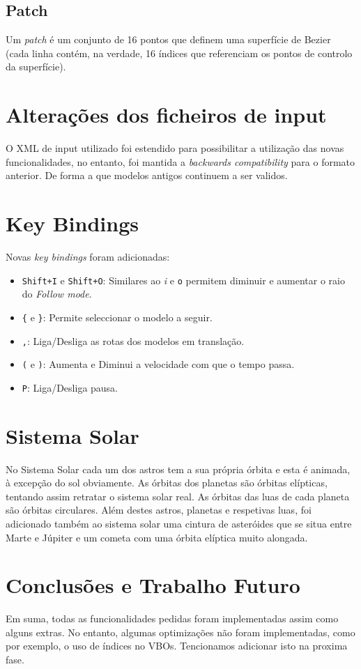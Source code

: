 \documentclass[a4paper]{article}
\begin{document}
\subsection{Patch}

Um \textit{patch} é um conjunto de 16 pontos que definem uma superfície de Bezier (cada linha contém, na verdade, 16 índices que referenciam os pontos de controlo da superfície).


\section{Alterações dos ficheiros de input}\label{sec:estrutura-ficheiros}

O XML de input utilizado foi estendido para possibilitar a utilização das novas funcionalidades, no entanto, foi mantida a \textit{backwards compatibility} para o formato anterior. De forma a que modelos antigos continuem a ser validos.

\section{Key Bindings}

Novas \textit{key bindings} foram adicionadas:

\begin{itemize}
    \item \texttt{Shift+I} e \texttt{Shift+O}: Similares ao \textit{i} e
        \texttt{o} permitem diminuir e aumentar o raio do \textit{Follow mode}.
    \item \verb!{! e \verb!}!: Permite seleccionar o modelo a seguir.
    \item \texttt{,}: Liga/Desliga as rotas dos modelos em translação.
    \item \verb!(! e \verb!)!: Aumenta e Diminui a velocidade com que o tempo
        passa.
    \item \texttt{P}: Liga/Desliga pausa.
\end{itemize}

\section{Sistema Solar}

No Sistema Solar cada um dos astros tem a sua própria órbita e esta é animada, à excepção do sol obviamente.
As órbitas dos planetas são órbitas elípticas, tentando assim retratar o sistema solar real. As órbitas das luas de cada planeta são órbitas circulares.
Além destes astros, planetas e respetivas luas, foi adicionado também ao sistema solar uma cintura de asteróides que se situa entre Marte e Júpiter e um cometa com uma órbita elíptica muito alongada.

\section{Conclusões e Trabalho Futuro}

Em suma, todas as funcionalidades pedidas foram implementadas assim como alguns extras. No entanto, algumas optimizações não foram implementadas, como por exemplo, o uso de índices no VBOs. Tencionamos adicionar isto na proxima fase.
\end{document}
